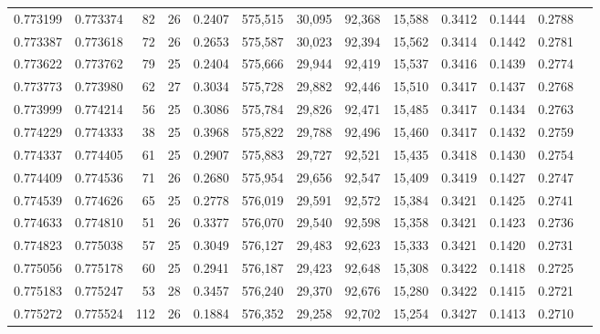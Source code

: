 \begin{tabular}{rrrrrrrrrrrrr}
0.773199 & 0.773374 &    82 &  26 &                                     0.2407 & 575,515 &  30,095 &  92,368 &  15,588 & 0.3412 & 0.1444 & 0.2788 \\
0.773387 & 0.773618 &    72 &  26 &                                     0.2653 & 575,587 &  30,023 &  92,394 &  15,562 & 0.3414 & 0.1442 & 0.2781 \\
0.773622 & 0.773762 &    79 &  25 &                                     0.2404 & 575,666 &  29,944 &  92,419 &  15,537 & 0.3416 & 0.1439 & 0.2774 \\
0.773773 & 0.773980 &    62 &  27 &                                     0.3034 & 575,728 &  29,882 &  92,446 &  15,510 & 0.3417 & 0.1437 & 0.2768 \\
0.773999 & 0.774214 &    56 &  25 &                                     0.3086 & 575,784 &  29,826 &  92,471 &  15,485 & 0.3417 & 0.1434 & 0.2763 \\
0.774229 & 0.774333 &    38 &  25 &                                     0.3968 & 575,822 &  29,788 &  92,496 &  15,460 & 0.3417 & 0.1432 & 0.2759 \\
0.774337 & 0.774405 &    61 &  25 &                                     0.2907 & 575,883 &  29,727 &  92,521 &  15,435 & 0.3418 & 0.1430 & 0.2754 \\
0.774409 & 0.774536 &    71 &  26 &                                     0.2680 & 575,954 &  29,656 &  92,547 &  15,409 & 0.3419 & 0.1427 & 0.2747 \\
0.774539 & 0.774626 &    65 &  25 &                                     0.2778 & 576,019 &  29,591 &  92,572 &  15,384 & 0.3421 & 0.1425 & 0.2741 \\
0.774633 & 0.774810 &    51 &  26 &                                     0.3377 & 576,070 &  29,540 &  92,598 &  15,358 & 0.3421 & 0.1423 & 0.2736 \\
0.774823 & 0.775038 &    57 &  25 &                                     0.3049 & 576,127 &  29,483 &  92,623 &  15,333 & 0.3421 & 0.1420 & 0.2731 \\
0.775056 & 0.775178 &    60 &  25 &                                     0.2941 & 576,187 &  29,423 &  92,648 &  15,308 & 0.3422 & 0.1418 & 0.2725 \\
0.775183 & 0.775247 &    53 &  28 &                                     0.3457 & 576,240 &  29,370 &  92,676 &  15,280 & 0.3422 & 0.1415 & 0.2721 \\
0.775272 & 0.775524 &   112 &  26 &                                     0.1884 & 576,352 &  29,258 &  92,702 &  15,254 & 0.3427 & 0.1413 & 0.2710 \\

\end{tabular}

